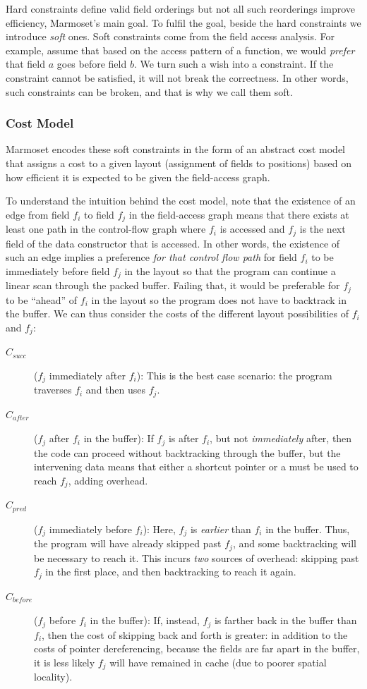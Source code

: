 \documentclass[acmsmall,review,anonymous]{acmart}\settopmatter{printfolios=true,printccs=false,printacmref=false}
\newcommand{\new}[1]{{\color{very-dark-green}{#1}}}
\newcommand{\new}[1]{#1}
\newcommand{\system}{{\sc Marmoset}\xspace}
\begin{document}
Hard constraints define valid field orderings but not all such reorderings improve efficiency, \system's main goal.
To fulfil the goal, beside the hard constraints we introduce {\em soft} ones. Soft constraints come from the field access analysis. For example, assume that based on the access pattern of a function, we would {\em prefer} that field $a$ goes before field $b$. We turn such a wish into a constraint. If the constraint cannot be satisfied, it will not break the correctness. In other words, such constraints can be broken, and that is why we call them soft.

\subsubsection{Cost Model}
\system encodes these soft constraints in the form of an abstract cost model that assigns a cost to a given layout (assignment of fields to positions) based on how efficient it is expected to be given the field-access graph.

To understand the intuition behind the cost model, note that the existence of an edge from field $f_i$ to field $f_j$ in the field-access graph means that there exists at least one path in the control-flow graph where $f_i$ is accessed and $f_j$ is the next field of the data constructor that is accessed.
In other words, the existence of such an edge implies a preference {\em for that control flow path} for field $f_i$ to be immediately before field $f_j$ in the layout so that the program can continue a linear scan through the packed buffer. 
Failing that, it would be preferable for $f_j$ to be ``ahead'' of $f_i$ in the layout so the program does not have to backtrack in the buffer.
We can thus consider the costs of the different layout possibilities of $f_i$ and $f_j$:

\begin{description}
	\item[$C_{\mathit{succ}}$] ($f_j$ immediately after $f_i$): This is the best case scenario: the program traverses $f_i$ and then uses $f_j$.
	\item[$C_{\mathit{after}}$] ($f_j$ after $f_i$ in the buffer): If $f_j$ is after $f_i$, but not {\em immediately} after, then the code can proceed without backtracking through the buffer, but the intervening data means that either a shortcut pointer or a \new{extra traversal} must be used to reach $f_j$, adding overhead.
	\item[$C_{\mathit{pred}}$] ($f_j$ immediately before $f_i$): Here, $f_j$ is {\em earlier} than $f_i$ in the buffer. Thus, the program will have already skipped past $f_j$, and some backtracking will be necessary to reach it. This incurs {\em two} sources of overhead: skipping past $f_j$ in the first place, and then backtracking to reach it again.
	\item[$C_{\mathit{before}}$] ($f_j$ before $f_i$ in the buffer): If, instead, $f_j$ is farther back in the buffer than $f_i$, then the cost of skipping back and forth is greater: in addition to the costs of pointer dereferencing, because the fields are far apart in the buffer, it is less likely $f_j$ will have remained in cache (due to poorer spatial locality).
\end{description}
\end{document}
